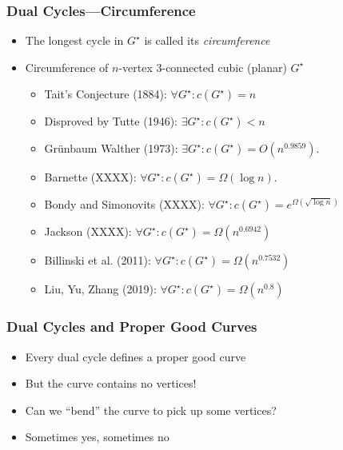\documentclass[xcolor=dvipsnames]{beamer}
\newcommand{\dual}[1]{#1^\star}
\begin{document}
\begin{frame}
   \frametitle{Dual Cycles---Circumference}

   \begin{itemize}[<+->]
      \item The longest cycle in $\dual{G}$ is called its \emph{circumference} 
      \item Circumference of $n$-vertex 3-connected cubic (planar) $\dual{G}$
      \begin{itemize}
        \item Tait's Conjecture (1884): $\forall \dual{G}: c(\dual{G}) = n$
        \item Disproved by Tutte (1946): $\exists \dual{G}: c(\dual{G})< n$
        \item Gr\"unbaum Walther (1973): $\exists \dual{G}: c(\dual{G}) = O(n^{0.9859})$.
        \item Barnette (XXXX): $\forall \dual{G}: c(\dual{G})=\Omega(\log n)$.
        \item Bondy and Simonovits (XXXX): $\forall \dual{G}: c(\dual{G})=e^{\Omega(\sqrt{\log n})}$
        \item Jackson (XXXX): $\forall \dual{G}: c(\dual{G}) = \Omega(n^{0.6942})$
        \item Billinski et al. (2011): $\forall \dual{G}: c(\dual{G}) = \Omega(n^{0.7532})$
        \item Liu, Yu, Zhang (2019): $\forall \dual{G}: c(\dual{G}) = \Omega(n^{0.8})$
      \end{itemize}
   \end{itemize}
\end{frame}

\begin{frame}
   \frametitle{Dual Cycles and Proper Good Curves}

   \begin{itemize}[<+->]
      \item Every dual cycle defines a proper good curve
      \item But the curve contains no vertices!
      \item Can we ``bend'' the curve to pick up some vertices?
      \item Sometimes yes, sometimes no
      \begin{center}
      \end{center}
   \end{itemize}

\end{frame}
\end{document}
